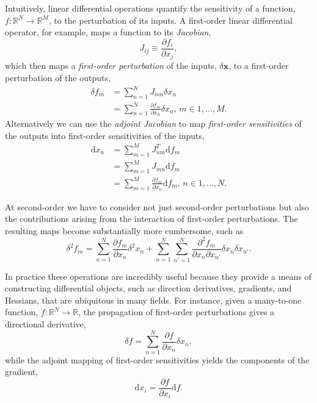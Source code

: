 Intuitively, linear differential operations quantify the sensitivity of a function, 
$f : \mathbb{R}^{N} \rightarrow \mathbb{R}^{M}$, to the perturbation of its inputs.  
A first-order linear differential operator, for example, maps a function to its \textit{Jacobian},
%
\begin{equation*}
J_{ij} \equiv \frac{ \partial f_{i} }{ \partial x_{j} },
\end{equation*}
%
which then maps a \textit{first-order perturbation} of the inputs, $\delta \mathbf{x}$, 
to a first-order perturbation of the outputs,
%
\begin{align*}
\delta f_{m} 
&=
\sum_{n= 1}^{N} J_{mn} \delta x_{n}
\\
&= 
\sum_{n= 1}^{N} \frac{ \partial f_{m} }{ \partial x_{n} } \delta x_{n}, \, m \in 1, \ldots, M.
\end{align*} 
%
Alternatively we can use the \textit{adjoint Jacobian} to map \textit{first-order sensitivities}
of the outputs into first-order sensitivities of the inputs,
%
\begin{align*}
\mathrm{d} x_{n} 
&= 
\sum_{m = 1}^{M} J^{T}_{nm} \mathrm{d} f_{m}
\\
&=
\sum_{m = 1}^{M} J_{mn} \mathrm{d} f_{m}
\\
&=
\sum_{m = 1}^{M} \frac{ \partial f_{m} }{ \partial x_{n} } \mathrm{d} f_{m}, \, n \in 1, \ldots, N.
\end{align*}

At second-order we have to consider not just second-order perturbations but also the 
contributions arising from the interaction of first-order perturbations.  The resulting 
maps become substantially more cumbersome, such as
%
\begin{equation*}
\delta^{2} f_{m} 
= \sum_{n = 1}^{N} \frac{ \partial f_{m} }{ \partial x_{n} } \delta^{2} x_{n} 
+ \sum_{n = 1}^{N} \sum_{n' = 1}^{N} 
\frac{ \partial^{2} f_{m} }{ \partial x_{n} \partial x_{n'} } 
\delta x_{n} \delta x_{n'}.
\end{equation*}

In practice these operations are incredibly useful because they provide a means of
constructing differential objects, such as direction derivatives, gradients, and Hessians, 
that are ubiquitous in many fields.  For instance, given a many-to-one function,
$f : \mathbb{R}^{N} \rightarrow \mathbb{R}$, the propagation of first-order perturbations
gives a directional derivative,
%
\begin{equation*}
\delta f = \sum_{n = 1}^{N} \frac{ \partial f }{ \partial x_{n} } \delta x_{n},
\end{equation*}
%
while the adjoint mapping of first-order sensitivities yields the components of the gradient,
%
\begin{equation*}
\mathrm{d} x_{i} = \frac{ \partial f }{ \partial x_{i} } \mathrm{d} f.
\end{equation*}

